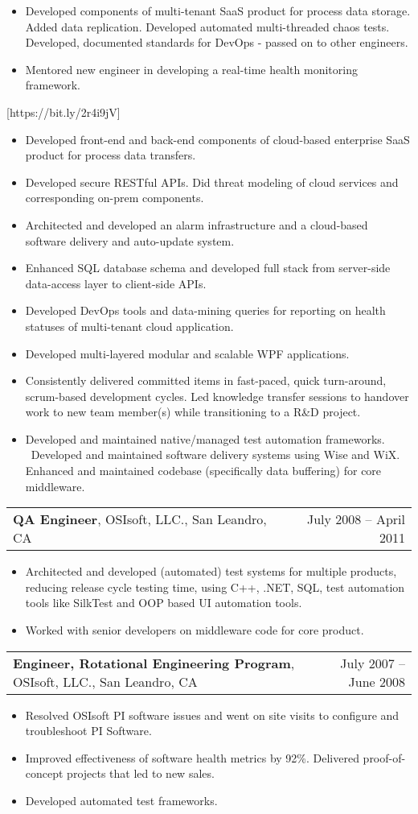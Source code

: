 \documentclass[letterpaper,10pt]{article}
\makeatletter
\newcommand{\experienceItem}[3]{
	\begin{tabular*}{\textwidth}{c@{\extracolsep{\fill}}c}
		\multicolumn{1}{l}{\textbf{#1}, #2} & \multicolumn{1}{r}{#3}\\
	\end{tabular*}\vspace{-10pt}
}
\newcommand{\resumeItemListStart}{\begin{itemize}}
\newcommand{\resumeItemListEnd}{\end{itemize}}
\newcommand{\resumeListItem}[1]{
	\item{#1 \vspace{-6pt}}
}
\makeatother
\begin{document}
	\resumeItemListStart
	\resumeListItem {Developed components of multi-tenant SaaS product for process data storage. Added data replication. Developed automated multi-threaded chaos tests. Developed, documented standards for DevOps -  passed on to other engineers.}
	\resumeListItem {Mentored new engineer in developing a real-time health monitoring framework.}
	\resumeItemListEnd

	[https://bit.ly/2r4i9jV]
	
	\resumeItemListStart
	\resumeListItem {Developed front-end and back-end components of cloud-based enterprise SaaS product for process data transfers.}
	\resumeListItem {Developed secure RESTful APIs. Did threat modeling of cloud services and corresponding on-prem components.}
	\resumeListItem {Architected and developed an alarm infrastructure and a cloud-based software delivery and auto-update system.}
	\resumeListItem {Enhanced SQL database schema and developed full stack from server-side data-access layer to client-side APIs.}
	\resumeListItem {Developed DevOps tools and data-mining queries for reporting on health statuses of multi-tenant cloud application.}
	\resumeListItem {Developed multi-layered modular and scalable WPF applications.}
	\resumeListItem {Consistently delivered committed items in fast-paced, quick turn-around, scrum-based development cycles. Led knowledge transfer sessions to handover work to new team member(s) while transitioning to a R\&D project.}
	\resumeItemListEnd

	
	\resumeItemListStart
	\resumeListItem {Developed and maintained native/managed test automation frameworks. \ Developed and maintained software delivery systems using Wise and WiX. Enhanced and maintained codebase (specifically data buffering) for core middleware.}
	\resumeItemListEnd
	
	\experienceItem{QA Engineer}{OSIsoft, LLC., San Leandro, CA}{July 2008 -- April 2011}	
	\vspace{-8pt}
	\resumeItemListStart
	\resumeListItem {Architected and developed (automated) test systems for multiple products, reducing release cycle testing time, using C++, .NET, SQL, test automation tools like SilkTest and OOP based UI automation tools.}
	\resumeListItem {Worked with senior developers on middleware code for core product.}
	\resumeItemListEnd
	
	\experienceItem{Engineer, Rotational Engineering Program}{OSIsoft, LLC., San Leandro, CA}{July 2007 -- June 2008}
	\vspace{-8pt}	
	\resumeItemListStart
	\resumeListItem {Resolved OSIsoft PI software issues and went on site visits to configure and troubleshoot PI Software.}
	\resumeListItem {Improved effectiveness of software health metrics by 92\%. Delivered proof-of-concept projects that led to new sales.}
	\resumeListItem {Developed automated test frameworks.}
	\resumeItemListEnd
	
\end{document}
